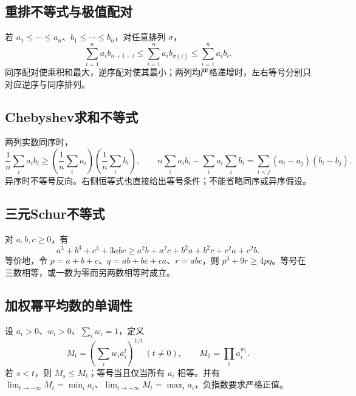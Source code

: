 \documentclass[../main.tex]{subfiles}
\begin{document}
\subsection{重排不等式与极值配对}
若 $a_1\le\cdots\le a_n$、$b_1\le\cdots\le b_n$，对任意排列 $\sigma$，
\[
\sum_{i=1}^na_ib_{n+1-i}\le\sum_{i=1}^na_ib_{\sigma(i)}
\le\sum_{i=1}^na_ib_i.
\]
同序配对使乘积和最大，逆序配对使其最小；两列均严格递增时，左右等号分别只对应逆序与同序排列。
\subsection{Chebyshev求和不等式}
两列实数同序时，
\[
\frac1n\sum_i a_ib_i\ge
\left(\frac1n\sum_i a_i\right)\left(\frac1n\sum_i b_i\right),\qquad
n\sum_i a_ib_i-\sum_i a_i\sum_i b_i
=\sum_{i<j}(a_i-a_j)(b_i-b_j).
\]
异序时不等号反向。右侧恒等式也直接给出等号条件；不能省略同序或异序假设。
\subsection{三元Schur不等式}
对 $a,b,c\ge0$，有
\[
a^3+b^3+c^3+3abc
\ge a^2b+a^2c+b^2a+b^2c+c^2a+c^2b.
\]
等价地，令 $p=a+b+c$、$q=ab+bc+ca$、$r=abc$，则 $p^3+9r\ge4pq$。等号在三数相等，或一数为零而另两数相等时成立。
\subsection{加权幂平均数的单调性}
设 $a_i>0$、$w_i>0$、$\sum_iw_i=1$，定义
\[
M_t=\left(\sum_iw_i a_i^t\right)^{1/t}\ (t\ne0),\qquad
M_0=\prod_i a_i^{w_i}.
\]
若 $s<t$，则 $M_s\le M_t$；等号当且仅当所有 $a_i$ 相等。并有 $\lim_{t\to-\infty}M_t=\min_i a_i$、$\lim_{t\to+\infty}M_t=\max_i a_i$，负指数要求严格正值。
\clearpage
\end{document}
